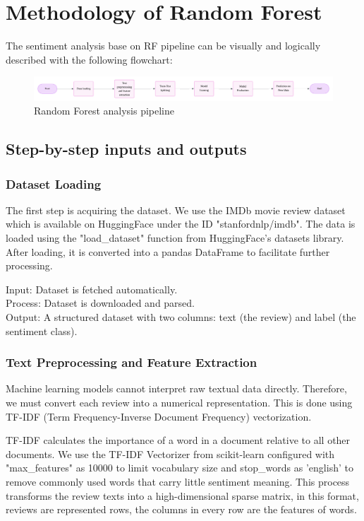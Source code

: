 \section{Methodology of Random Forest}

The sentiment analysis base on RF pipeline can be visually and logically described with the following flowchart:

\begin{figure}[ht]
    \centering
    \includegraphics[width=1\textwidth]{pics/rf_steps.png}
    \caption{Random Forest analysis pipeline}
\end{figure}

\subsection{Step-by-step inputs and outputs}

\subsubsection{Dataset Loading}
The first step is acquiring the dataset. We use the IMDb movie review dataset which is available on HuggingFace under the ID "stanfordnlp/imdb". The data is loaded using the "load\_dataset" function from HuggingFace's datasets library. After loading, it is converted into a pandas DataFrame to facilitate further processing.

Input: Dataset is fetched automatically.\\
Process: Dataset is downloaded and parsed.\\
Output: A structured dataset with two columns: text (the review) and label (the sentiment class).

\subsubsection{Text Preprocessing and Feature Extraction}
Machine learning models cannot interpret raw textual data directly. Therefore, we must convert each review into a numerical representation. This is done using TF-IDF (Term Frequency-Inverse Document Frequency) vectorization.

TF-IDF calculates the importance of a word in a document relative to all other documents. We use the TF-IDF Vectorizer from scikit-learn configured with "max\_features" as 10000 to limit vocabulary size and stop\_words as 'english' to remove commonly used words that carry little sentiment meaning.
This process transforms the review texts into a high-dimensional sparse matrix, in this format, reviews are represented rows, the columns in every row are the features of words.


